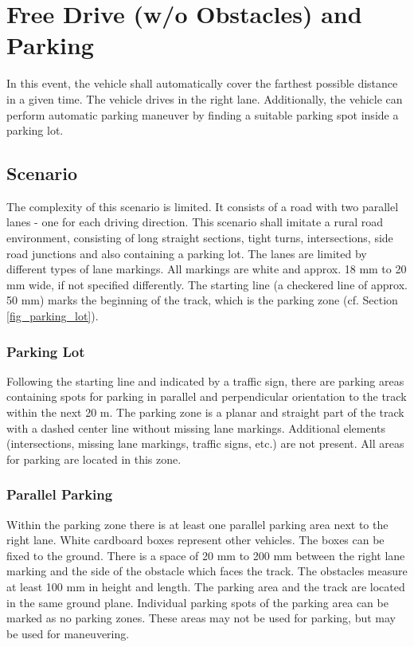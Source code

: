 \section{Free Drive (w/o Obstacles) and Parking}

In this event, the vehicle shall automatically cover the farthest possible
distance in a given time. The vehicle drives in the right lane. Additionally,
the vehicle can perform automatic parking maneuver by finding a suitable
parking spot inside a parking lot.

\subsection{Scenario}

The complexity of this scenario is limited. It consists of a road with two
parallel lanes - one for each driving direction. This scenario shall imitate a
rural road environment, consisting of long straight sections, tight turns,
intersections, side road junctions and also containing a parking lot. The lanes
are limited by different types of lane markings. All markings are white and
approx. 18 mm to 20 mm wide, if not specified differently. The starting line (a
checkered line of approx. 50 mm) marks the beginning of the track, which is the
parking zone (cf. Section \ref{fig_parking_lot}).

\subsubsection{Parking Lot}

Following the starting line and indicated by a traffic sign, there are parking
areas containing spots for parking in parallel and perpendicular orientation to
the track within the next 20 m. The parking zone is a planar and straight part
of the track with a dashed center line without missing lane markings.
Additional elements (intersections, missing lane markings, traffic signs, etc.)
are not present. All areas for parking are located in this zone.

\subsubsection{Parallel Parking}

Within the parking zone there is at least one parallel parking area next to the
right lane. White cardboard boxes represent other vehicles. The boxes can be
fixed to the ground. There is a space of 20 mm to 200 mm between the right lane
marking and the side of the obstacle which faces the track. The obstacles
measure at least 100 mm in height and length. The parking area and the track
are located in the same ground plane. Individual parking spots of the parking
area can be marked as no parking zones. These areas may not be used for
parking, but may be used for maneuvering.

